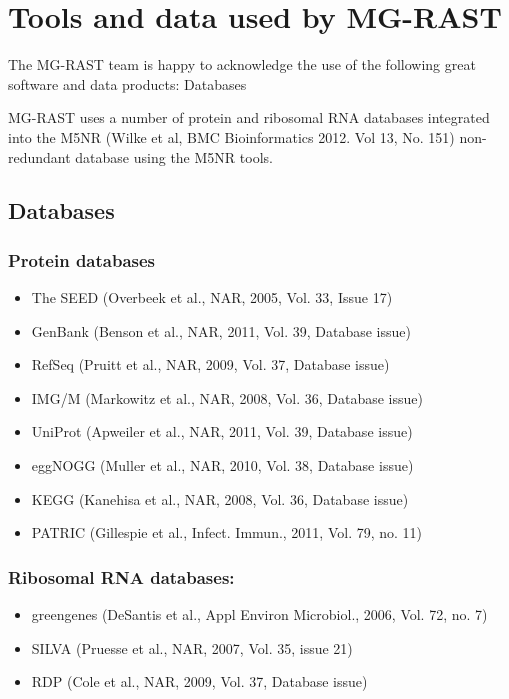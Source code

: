 \documentclass[12pt,fullpage]{report}
\begin{document}
\chapter{Tools and data used by MG-RAST}
The MG-RAST team is happy to acknowledge the use of the following great software and data products:
Databases

MG-RAST uses a number of protein and ribosomal RNA databases integrated into the M5NR \cite{M5NR} (Wilke et al, BMC Bioinformatics 2012. Vol 13, No. 151) non-redundant database using the M5NR tools.
\section{Databases}
\subsection{Protein databases}
\begin{itemize}
  \item    The \gls{SEED} \cite{SUBSYSTEMS} (Overbeek et al., NAR, 2005, Vol. 33, Issue 17)
 \item     GenBank \cite{GENBANK} (Benson et al., NAR, 2011, Vol. 39, Database issue)
 \item     RefSeq \cite{REFSEQ} (Pruitt et al., NAR, 2009, Vol. 37, Database issue)
  \item    IMG/M (Markowitz et al., NAR, 2008, Vol. 36, Database issue)
  \item    UniProt \cite{UNIPROT} (Apweiler et al., NAR, 2011, Vol. 39, Database issue)
 \item     eggNOGG \cite{EGGNOG} (Muller et al., NAR, 2010, Vol. 38, Database issue)
 \item     KEGG \cite{KEGG} (Kanehisa et al., NAR, 2008, Vol. 36, Database issue)
\item     PATRIC \cite{PATRIC} (Gillespie et al., Infect. Immun., 2011, Vol. 79, no. 11)
\end{itemize}
\subsection{Ribosomal RNA databases:}
\begin{itemize}
  \item    greengenes \cite{GREENGENES} (DeSantis et al., Appl Environ Microbiol., 2006, Vol. 72, no. 7)
  \item    SILVA \cite{SILVA} (Pruesse et al., NAR, 2007, Vol. 35, issue 21)
  \item    RDP \cite{RDP} (Cole et al., NAR, 2009, Vol. 37, Database issue)
\end{itemize}
\end{document}
